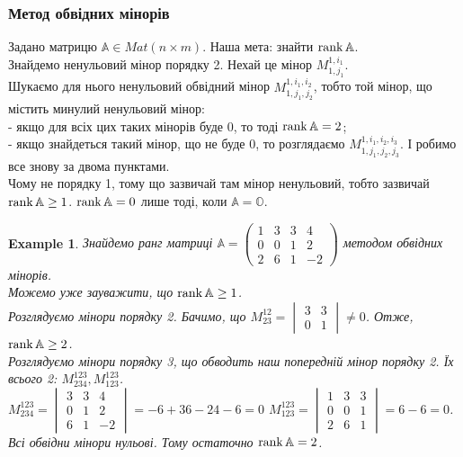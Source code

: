 \documentclass[a4paper, 10pt]{article}
\theoremstyle{theoremdd}
\theoremstyle{theoremdd}
\theoremstyle{theoremdd}
\theoremstyle{theoremdd}
\newtheorem{example}[theorem]{Example}
\theoremstyle{theoremdd}
\theoremstyle{theoremdd}
\theoremstyle{theoremdd}
\theoremstyle{theoremdd}
\begin{document}
\subsubsection*{Метод обвідних мінорів}
Задано матрицю $\mathbb{A} \in Mat(n \times m)$. Наша мета: знайти $\rank \mathbb{A}$.\\
Знайдемо ненульовий мінор порядку 2. Нехай це мінор $M_{1,j_1}^{1,i_1}$.\\
Шукаємо для нього ненульовий обвідний мінор $M_{1,j_1,j_2}^{1,i_1,i_2}$, тобто той мінор, що містить минулий ненульовий мінор:\\
- якщо для всіх цих таких мінорів буде 0, то тоді $\rank \mathbb{A} = 2$;\\
- якщо знайдеться такий мінор, що не буде 0, то розглядаємо $M_{1,j_1,j_2,j_3}^{1,i_1,i_2,i_3}$. І робимо все знову за двома пунктами.
\bigskip \\
Чому не порядку 1, тому що зазвичай там мінор ненульовий, тобто зазвичай $\rank \mathbb{A} \geq 1$. $\rank \mathbb{A} = 0$ лише тоді, коли $\mathbb{A} = \mathbb{O}$.

\begin{example}
Знайдемо ранг матриці $\mathbb{A} = \begin{pmatrix}
1 & 3 & 3 & 4 \\
0 & 0 & 1 & 2 \\
2 & 6 & 1 & -2
\end{pmatrix}$ методом обвідних мінорів.\\
Можемо уже зауважити, що $\rank \mathbb{A} \geq 1$. \\
Розглядуємо мінори порядку 2. Бачимо, що $M^{12}_{23} = \begin{vmatrix}
3 & 3 \\
0 & 1
\end{vmatrix} \neq 0$. Отже, $\rank \mathbb{A} \geq 2$. \\
Розглядуємо мінори порядку 3, що обводить наш попередній мінор порядку 2. Їх всього 2: $M^{123}_{234},M^{123}_{123}$.\\
$M^{123}_{234} = \begin{vmatrix}
3 & 3 & 4 \\
0 & 1 & 2 \\
6 & 1 & -2
\end{vmatrix} = -6+36-24-6 = 0$ \hspace{1cm} $M^{123}_{123} = \begin{vmatrix}
1 & 3 & 3 \\
0 & 0 & 1 \\
2 & 6 & 1
\end{vmatrix} = 6 - 6 = 0$.\\
Всі обвідни мінори нульові. Тому остаточно $\rank \mathbb{A} = 2$.
\end{example}
\end{document}
